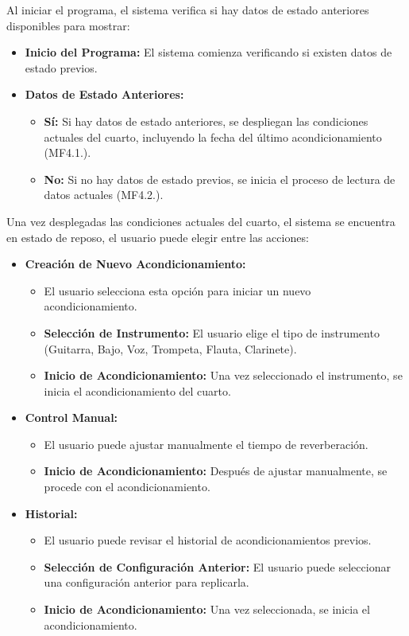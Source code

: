 Al iniciar el programa, el sistema verifica si hay datos de estado anteriores disponibles para mostrar: \\

\begin{itemize}[label={}, leftmargin=0pt]
    \item \textbf{Inicio del Programa:} El sistema comienza verificando si existen datos de estado previos.
    \item \textbf{Datos de Estado Anteriores:}
    \begin{itemize}
        \item \textbf{Sí:} Si hay datos de estado anteriores, se despliegan las condiciones actuales del cuarto, incluyendo la fecha del último acondicionamiento (MF4.1.).
        \item \textbf{No:} Si no hay datos de estado previos, se inicia el proceso de lectura de datos actuales (MF4.2.). \\
    \end{itemize}
\end{itemize}

Una vez desplegadas las condiciones actuales del cuarto, el sistema se encuentra en estado de reposo, el usuario puede elegir entre las acciones: \\

\begin{itemize}[label={}, leftmargin=0pt]
    \item \textbf{Creación de Nuevo Acondicionamiento:} 
    \begin{itemize}
        \item El usuario selecciona esta opción para iniciar un nuevo acondicionamiento.
        \item \textbf{Selección de Instrumento:} El usuario elige el tipo de instrumento (Guitarra, Bajo, Voz, Trompeta, Flauta, Clarinete).
        \item \textbf{Inicio de Acondicionamiento:} Una vez seleccionado el instrumento, se inicia el acondicionamiento del cuarto.
    \end{itemize}
    \item \textbf{Control Manual:}
    \begin{itemize}
        \item El usuario puede ajustar manualmente el tiempo de reverberación.
        \item \textbf{Inicio de Acondicionamiento:} Después de ajustar manualmente, se procede con el acondicionamiento.
    \end{itemize}
    \item \textbf{Historial:}
    \begin{itemize}
        \item El usuario puede revisar el historial de acondicionamientos previos.
        \item \textbf{Selección de Configuración Anterior:} El usuario puede seleccionar una configuración anterior para replicarla.
        \item \textbf{Inicio de Acondicionamiento:} Una vez seleccionada, se inicia el acondicionamiento. \\
    \end{itemize}
\end{itemize}


